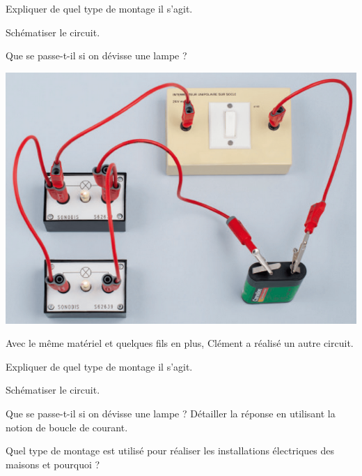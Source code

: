 \begin{questions}
	\question Expliquer de quel type de montage il s'agit.
	
	\question Schématiser le circuit.
	
	\question Que se passe-t-il si on dévisse une lampe ?
	
\begin{center}
	\includegraphics[scale=0.35]{img/circuit_B}
\end{center}
	Avec le même matériel et quelques fils en plus, Clément a réalisé un autre circuit.
	
	\question Expliquer de quel type de montage il s'agit.
	
	\question Schématiser le circuit.
	
	\question Que se passe-t-il si on dévisse une lampe ? Détailler la réponse en utilisant la notion de boucle de courant.
	
	\question Quel type de montage est utilisé pour réaliser les installations électriques des maisons et pourquoi ?
		
\end{questions}

